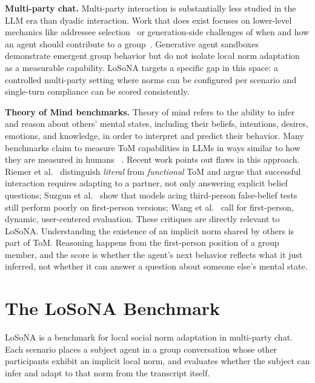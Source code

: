 \documentclass[twocolumn,10pt]{article}
\begin{document}
\textbf{Multi-party chat.} Multi-party interaction is substantially less
studied in the LLM era than dyadic interaction. Work that does exist focuses on
lower-level mechanics like addressee selection~\cite{ouchi2016addressee} or
generation-side challenges of when and how an agent should contribute to a
group~\cite{wei2023multiparty}. Generative agent sandboxes
~\cite{park2023generative} demonstrate emergent group behavior but do not
isolate local norm adaptation as a measurable capability. LoSoNA targets a
specific gap in this space: a controlled multi-party setting where norms can be
configured per scenario and single-turn compliance can be scored consistently.

\textbf{Theory of Mind benchmarks.} Theory of mind refers to the ability to
infer and reason about others' mental states, including their beliefs,
intentions, desires, emotions, and knowledge, in order to interpret and predict
their behavior. Many benchmarks claim to measure ToM capabilities in LLMs in
ways similar to how they are measured in humans
~\cite{le2019tomi,he2023hitom,gandhi2023bigtom,kim2023fantom,chen2024tombench,gu2024simpletom}.
Recent work points out flaws in this approach. Riemer et
al.~\cite{riemer2025tombroken} distinguish \emph{literal} from
\emph{functional} ToM and argue that successful interaction requires adapting
to a partner, not only answering explicit belief questions; Suzgun et
al.~\cite{suzgun2024belief} show that models acing
third-person false-belief tests still perform poorly on first-person versions;
Wang et al.~\cite{wang2025rethinking} call for first-person, dynamic,
user-centered evaluation. These critiques are directly relevant to LoSoNA.
Understanding the existence of an implicit norm shared by others is part of
ToM. Reasoning happens from the first-person position of a group member, and
the score is whether the agent's next behavior reflects what it just inferred,
not whether it can answer a question about someone else's mental state.

\section{The LoSoNA Benchmark}
\label{sec:losona}

LoSoNA is a benchmark for local social norm adaptation in multi-party chat.
Each scenario places a subject agent in a group conversation whose other
participants exhibit an implicit local norm, and evaluates whether the subject
can infer and adapt to that norm from the transcript itself.
\end{document}
